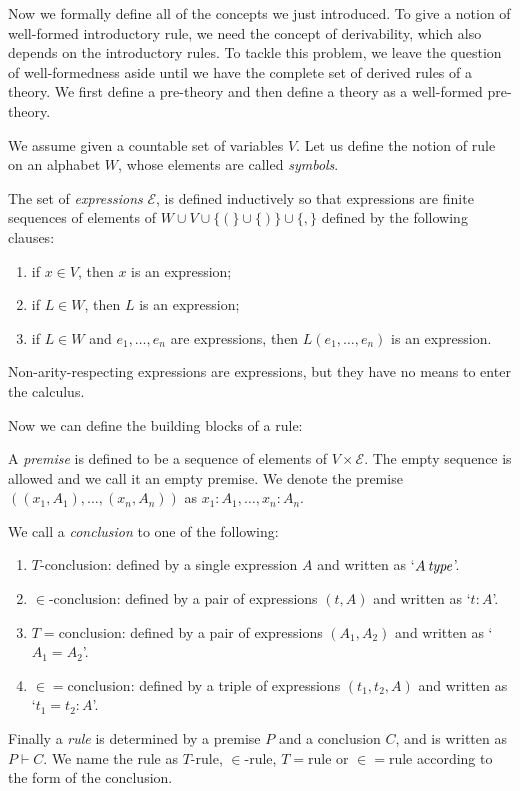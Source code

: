 Now we formally define all of the concepts 
we just introduced.
To give a notion of well-formed introductory rule, we need the concept of derivability,
which also depends on the introductory rules. 
To tackle this problem, we leave the question of
well-formedness aside until we have the complete set of derived rules
of a theory.
We first define a pre-theory and then define a theory
as a well-formed pre-theory.

We assume given a countable set of variables $V$.
Let us define the notion of rule on an alphabet $W$,
whose elements are called \textit{symbols}.

\begin{definition}
    The set of \textit{expressions} $\mathcal{E}$, is defined inductively
    so that expressions are finite sequences of elements
    of $W \cup V \cup \{(\} \cup \{)\} \cup \{,\}$
    defined by the following clauses:
    \begin{enumerate}
        \item if $x \in V$, then $x$ is an expression;
        \item if $L \in W$, then $L$ is an expression;
        \item if $L \in W$ and $e_1, \dots, e_n$ are expressions,
              then $L(e_1, \dots, e_n)$ is an expression.
    \end{enumerate}
\end{definition}
\begin{remark}
    Non-arity-respecting expressions are expressions, but they have no means to enter the calculus.
\end{remark}

Now we can define the building blocks of a rule:
\begin{definition}
    A \textit{premise} is defined to be a sequence of elements of $V \times \mathcal{E}$.
    The empty sequence is allowed and we call it an empty premise.
    We denote the premise $((x_1, A_1), \dots, (x_n, A_n))$  
    as $x_1 \colon A_1, \dots, x_n \colon A_n$.
\end{definition}
\begin{definition}
    We call a \textit{conclusion} to one of the following:
    \begin{enumerate}
        \item $T$-conclusion: defined by a single expression $A$
              and written as `$A \operatorname{\mathit{\space type}}$'.
        \item $\in$-conclusion: defined by a pair of expressions $(t, A)$
              and written as `$t \colon A$'.
        \item $T{=}$conclusion: defined by a pair of expressions $(A_1, A_2)$
              and written as `$A_1 = A_2$'.
        \item $\in=$conclusion: defined by a triple of expressions $(t_1, t_2, A)$
              and written as `$t_1 = t_2 \colon A$'.
    \end{enumerate}
    Finally a \textit{rule} is determined by a premise $P$ and a
    conclusion $C$, and is written as $P \vdash C$.
    We name the rule as $T$-rule, $\in$-rule, $T{=}$rule or $\in=$rule
    according to the form of the conclusion.
\end{definition}


